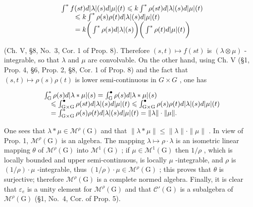 \[
\begin{array}{r l} & {\int^ {*} f (s t) d | \lambda | (s) d | \mu | (t) \leqslant k \int^ {*} \rho (s t) d | \lambda | (s) d | \mu | (t)} \\ & {\qquad \leqslant k \int^ {*} \rho (s) \rho (t) d | \lambda | (s) d | \mu | (t)} \\ & {\qquad = k \bigg (\int^ {*} \rho (s) d | \lambda | (s) \bigg) \bigg (\int^ {*} \rho (t) d | \mu | (t) \bigg)} \end{array}
\]

(Ch. V, §8, No.~3, Cor. 1 of Prop. 8). Therefore \((s,t) \mapsto f(st)\) is \((\lambda \otimes \mu)\) -integrable, so that \(\lambda\) and \(\mu\) are convolvable. On the other hand, using Ch. V (§1, Prop. 4, §6, Prop. 2, §8, Cor. 1 of Prop. 8) and the fact that \((s,t) \mapsto \rho(s)\rho(t)\) is lower semi-continuous in \(G \times G\) , one has

\[
\begin{array}{r l} & {\int_ {\mathrm{G}} ^ {*} \rho (s) d | \lambda * \mu | (s) = \int_ {\mathrm{G}} ^ {\bullet} \rho (s) d | \lambda * \mu | (s)} \\ & {\quad \leqslant \int_ {\mathrm{G} \times \mathrm{G}} ^ {\bullet} \rho (s t) d | \lambda | (s) d | \mu | (t) \leqslant \int_ {\mathrm{G} \times \mathrm{G}} ^ {\bullet} \rho (s) \rho (t) d | \lambda | (s) d | \mu | (t)} \\ & {\quad = \int_ {\mathrm{G} \times \mathrm{G}} ^ {*} \rho (s) \rho (t) d | \lambda | (s) d | \mu | (t) = \| \lambda \| \cdot \| \mu \|.} \end{array}
\]

One sees that \(\lambda * \mu \in \mathcal{M}^{\rho}(\mathrm{G})\) and that \(\| \lambda * \mu \| \leqslant \| \lambda \| \cdot \| \mu \|\) . In view of Prop. 1, \(\mathcal{M}^{\rho}(\mathrm{G})\) is an algebra. The mapping \(\lambda \mapsto \rho \cdot \lambda\) is an isometric linear mapping \(\theta\) of \(\mathcal{M}^{\rho}(\mathrm{G})\) into \(\mathcal{M}^{1}(\mathrm{G})\) ; if \(\mu \in \mathcal{M}^{1}(\mathrm{G})\) then \(1 / \rho\) , which is locally bounded and upper semi-continuous, is locally \(\mu\) -integrable, and \(\rho\) is \((1 / \rho) \cdot \mu\) -integrable, thus \((1 / \rho) \cdot \mu \in \mathcal{M}^{\rho}(\mathrm{G})\) ; this proves that \(\theta\) is surjective; therefore \(\mathcal{M}^{\rho}(\mathrm{G})\) is a complete normed algebra. Finally, it is clear that \(\varepsilon_{e}\) is a unity element for \(\mathcal{M}^{\rho}(\mathrm{G})\) and that \(\mathcal{C}'(\mathrm{G})\) is a subalgebra of \(\mathcal{M}^{\rho}(\mathrm{G})\) (§1, No.~4, Cor. of Prop. 5).

